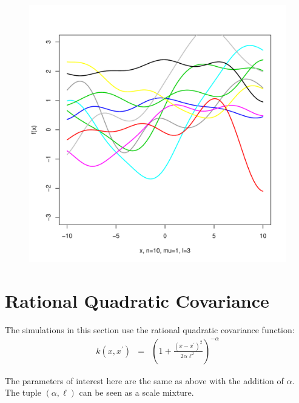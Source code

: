 \documentclass[12pt,letterpaper]{article}
\begin{document}
\begin{figure}
\begin{center}
\includegraphics[scale=0.2]{hw321/n10-m1-l3.pdf}
\end{center}
\end{figure}

\pagebreak
\section{Rational Quadratic Covariance}

The simulations in this section use the rational quadratic covariance function:
\begin{eqnarray*}
k(x, x^{\prime}) &=& (1 + \frac{ {(x - x^{\prime})^2} }{ 2 \alpha \ell^2  })^{-\alpha}
\end{eqnarray*} 

The parameters of interest here are the same as above with the addition of $\alpha$. The tuple $(\alpha, \ell)$ can be seen as a scale mixture. 
\end{document}
